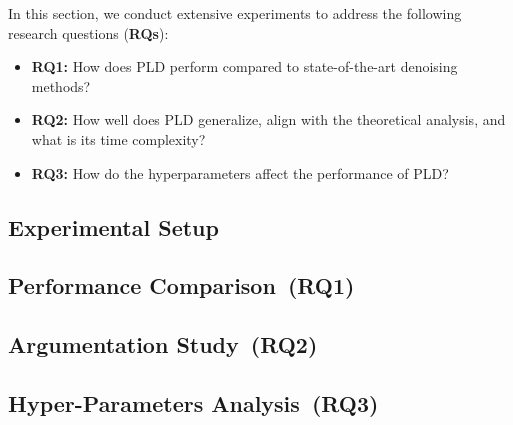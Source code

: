 In this section, we conduct extensive experiments to address the following research questions (\textbf{RQs}):
\begin{itemize}[leftmargin=*]
    \item \textbf{RQ1:} How does PLD perform compared to state-of-the-art denoising methods?
    \item \textbf{RQ2:} How well does PLD generalize, align with the theoretical analysis, and what is its time complexity?
    \item \textbf{RQ3:} How do the hyperparameters affect the performance of PLD?
\end{itemize}

\subsection{Experimental Setup}
\label{sec:exp_setup}



\subsection{Performance Comparison~(RQ1)}


\subsection{Argumentation Study~(RQ2)}
\label{sec:rq2}


\subsection{Hyper-Parameters Analysis~(RQ3)}
